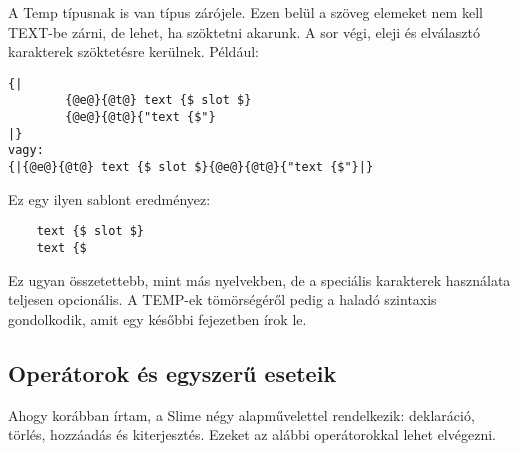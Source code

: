 A Temp típusnak is van típus zárójele. 
Ezen belül a szöveg elemeket nem kell TEXT-be zárni, de lehet, ha szöktetni akarunk. 
A sor végi, eleji és elválasztó karakterek szöktetésre kerülnek. Például:\begin{verbatim}
{| 
		{@e@}{@t@} text {$ slot $} 
		{@e@}{@t@}{"text {$"}
|}
vagy:
{|{@e@}{@t@} text {$ slot $}{@e@}{@t@}{"text {$"}|}
\end{verbatim}Ez egy ilyen sablont eredményez:

\begin{verbatim}
    text {$ slot $}
    text {$ 
\end{verbatim}


Ez ugyan összetettebb, mint más nyelvekben, de a speciális karakterek használata teljesen opcionális.
A TEMP-ek tömörségéről pedig a haladó szintaxis gondolkodik, amit egy későbbi fejezetben írok le. 


\subsection{Operátorok és egyszerű eseteik}
Ahogy korábban írtam, a Slime négy alapművelettel rendelkezik: deklaráció, törlés, hozzáadás és kiterjesztés. Ezeket az alábbi operátorokkal lehet elvégezni.


